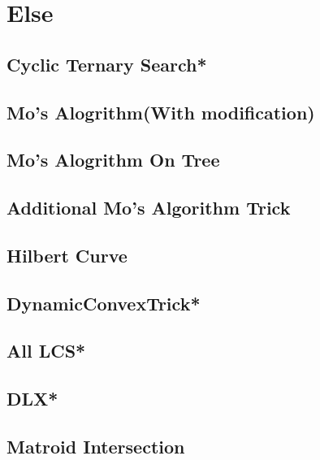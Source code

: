 \section{Else}
\subsection{Cyclic Ternary Search*} %

\subsection{Mo's Alogrithm(With modification)}

\subsection{Mo's Alogrithm On Tree}

\subsection{Additional Mo's Algorithm Trick}

\subsection{Hilbert Curve}

\subsection{DynamicConvexTrick*} %

% 
\subsection{All LCS*} %

\subsection{DLX*} %

\subsection{Matroid Intersection}

